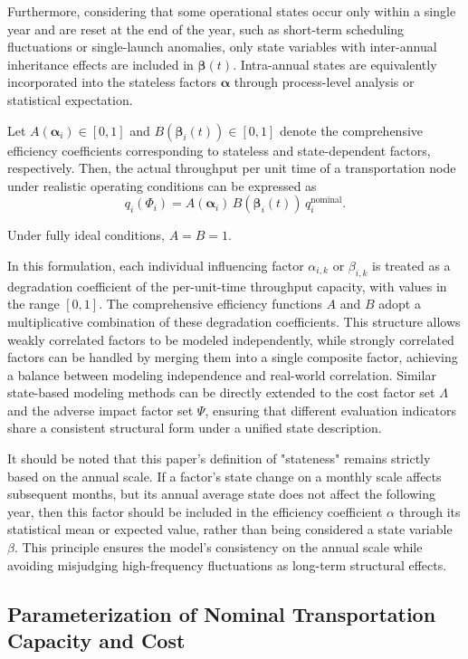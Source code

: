 \documentclass[12pt]{article}
\begin{document}
Furthermore, considering that some operational states occur only within a single year and are reset at the end of the year, such as short-term scheduling fluctuations or single-launch anomalies, only state variables with inter-annual inheritance effects are included in $\boldsymbol{\beta}(t)$. Intra-annual states are equivalently incorporated into the stateless factors $\boldsymbol{\alpha}$ through process-level analysis or statistical expectation.

Let $A(\boldsymbol{\alpha}_i) \in [0,1]$ and $B(\boldsymbol{\beta}_i(t)) \in [0,1]$ denote the comprehensive efficiency coefficients corresponding to stateless and state-dependent factors, respectively. Then, the actual throughput per unit time of a transportation node under realistic operating conditions can be expressed as
\[
q_i(\Phi_i) = A(\boldsymbol{\alpha}_i)\, B(\boldsymbol{\beta}_i(t))\, q_i^{\text{nominal}} .
\]

Under fully ideal conditions, $A = B = 1$.

In this formulation, each individual influencing factor $\alpha_{i,k}$ or $\beta_{i,k}$ is treated as a degradation coefficient of the per-unit-time throughput capacity, with values in the range $[0,1]$. The comprehensive efficiency functions $A$ and $B$ adopt a multiplicative combination of these degradation coefficients. This structure allows weakly correlated factors to be modeled independently, while strongly correlated factors can be handled by merging them into a single composite factor, achieving a balance between modeling independence and real-world correlation. Similar state-based modeling methods can be directly extended to the cost factor set $\Lambda$ and the adverse impact factor set $\Psi$, ensuring that different evaluation indicators share a consistent structural form under a unified state description.

It should be noted that this paper's definition of "stateness" remains strictly based on the annual scale. If a factor's state change on a monthly scale affects subsequent months, but its annual average state does not affect the following year, then this factor should be included in the efficiency coefficient $\alpha$ through its statistical mean or expected value, rather than being considered a state variable $\beta$. This principle ensures the model's consistency on the annual scale while avoiding misjudging high-frequency fluctuations as long-term structural effects.

\subsection{Parameterization of Nominal Transportation Capacity and Cost}
\end{document}
